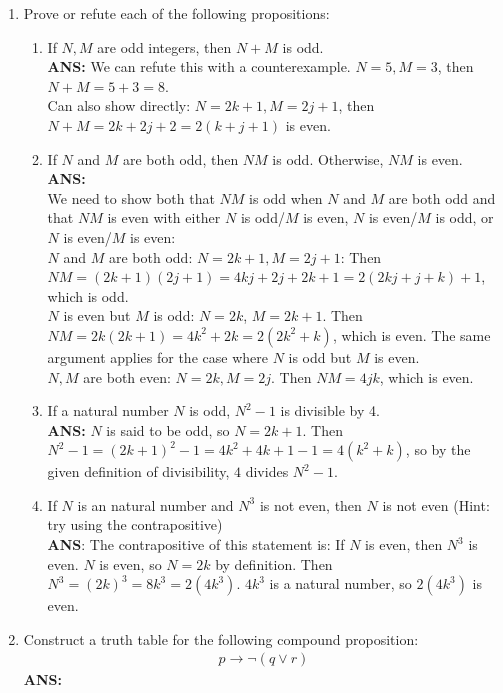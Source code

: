 \documentclass{article}
\begin{document}
\begin{enumerate}
\begin{enumerate}
        
    \end{enumerate}
    \item Prove or refute each of the following propositions:
    \begin{enumerate}
        \item If $N, M$ are odd integers, then $N + M$ is odd. \\
        \textbf{ANS: } We can refute this with a counterexample. $N = 5, M = 3$, then $N + M = 5 + 3 = 8$. \\ 
        Can also show directly: $N = 2k + 1, M = 2j + 1$, then $N + M = 2k + 2j + 2 = 2(k + j + 1)$ is even.
        \item If $N$ and $M$ are both odd, then $NM$ is odd. Otherwise, $NM$ is even. \\
        \textbf{ANS: } \\
        We need to show both that $NM$ is odd when $N$ and $M$ are both odd and that $NM$ is even with either $N$ is odd/$M$ is even, $N$ is even/$M$ is odd, or $N$ is even/$M$ is even: \\
        $N$ and $M$ are both odd: $N = 2k + 1, M = 2j + 1$: Then $NM = (2k + 1)(2j + 1) = 4kj + 2j + 2k + 1 = 2(2kj + j + k) + 1$, which is odd. \\
        $N$ is even but $M$ is odd: $N = 2k$, $M = 2k + 1$. Then $NM = 2k(2k + 1) = 4k^2 + 2k = 2(2k^2 + k)$, which is even. The same argument applies for the case where $N$ is odd but $M$ is even. \\
        $N, M$ are both even: $N = 2k, M = 2j$. Then $NM = 4jk$, which is even.
        \item If a natural number $N$ is odd, $N^2 - 1$ is divisible by 4. \\
        \textbf{ANS:} $N$ is said to be odd, so $N = 2k + 1$. Then $N^2 - 1 = (2k + 1)^2 - 1 = 4k^2 + 4k + 1 - 1 = 4(k^2 + k)$, so by the given definition of divisibility, $4$ divides $N^2 - 1$.
        
        \item If $N$ is an natural number and $N^3$ is not even, then $N$ is not even (Hint: try using the contrapositive) \\
        \textbf{ANS}: The contrapositive of this statement is: If $N$ is even, then $N^3$ is even. $N$ is even, so $N = 2k$ by definition. Then $N^3 = (2k)^3 = 8k^3 = 2(4k^3)$. $4k^3$ is a natural number, so $2(4k^3)$ is even.
    \end{enumerate}
    \item Construct a truth table for the following compound proposition:
    \begin{gather*}
        p \rightarrow \neg (q \lor r)
    \end{gather*}
    \textbf{ANS: } \\
    

\end{enumerate}
\end{document}

